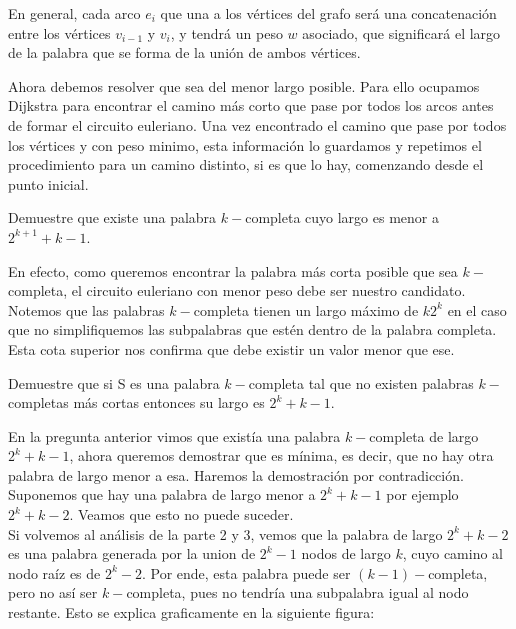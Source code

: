 \documentclass[letterpaper,10pt,table, dvipsnames]{article}
\begin{document}
En general, cada arco $e_i$ que una a los vértices del grafo será una concatenación entre los vértices $v_{i-1} $ y $v_i $, y tendrá un peso $w$ asociado, que significará el largo de la palabra que se forma de la unión de ambos vértices. 

Ahora debemos resolver que sea del menor largo posible. Para ello ocupamos Dijkstra para encontrar el camino más corto que pase por todos los arcos antes de formar el circuito euleriano. Una vez encontrado el camino que pase por todos los vértices y con peso minimo, esta información lo guardamos y repetimos el procedimiento para un camino distinto, si es que lo hay, comenzando desde el punto inicial.

\newpage

\begin{tcolorbox}
 Demuestre que existe una palabra $k-$completa cuyo largo es menor a $2^{k+1} + k - 1$.
\end{tcolorbox}
 
En efecto, como queremos encontrar la palabra más corta posible que sea $k-$completa, el circuito euleriano con menor peso debe ser nuestro candidato. Notemos que las palabras $k-$completa tienen un largo máximo de $k2^k$ en el caso que no simplifiquemos las subpalabras que estén dentro de la palabra completa. Esta cota superior nos confirma que debe existir un valor menor que ese. \\
  

\begin{tcolorbox}
  Demuestre que si S es una palabra $k-$completa tal que no existen palabras $k-$completas más cortas entonces su largo es $2^k + k - 1$.
\end{tcolorbox}

En la pregunta anterior vimos que existía una palabra $k-$completa de largo $2^k + k - 1$, ahora queremos demostrar que es mínima, es decir, que no hay otra palabra de largo menor a esa. Haremos la demostración por contradicción. \\

Suponemos que hay una palabra de largo menor a $2^k + k -1$ por ejemplo $2^k + k - 2$. Veamos que esto no puede suceder. \\

Si volvemos al análisis de la parte 2 y 3, vemos que la palabra de largo $2^k + k - 2$ es una palabra generada por la union de $2^k - 1$ nodos de largo $k$, cuyo camino al nodo raíz es de $2^k - 2$. Por ende, esta palabra puede ser $(k-1)-$completa, pero no así ser $k-$completa, pues no tendría una subpalabra igual al nodo restante. Esto se explica graficamente en la siguiente figura:
\end{document}

